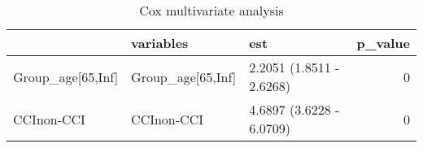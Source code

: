 \begin{table}

\caption{Cox multivariate analysis}
\centering
\begin{tabular}[t]{l|l|l|r}
\hline
  & variables & est & p\_value\\
\hline
Group\_age[65,Inf] & Group\_age[65,Inf] & 2.2051 (1.8511 - 2.6268) & 0\\
\hline
CCInon-CCI & CCInon-CCI & 4.6897 (3.6228 - 6.0709) & 0\\
\hline
\end{tabular}
\end{table}
